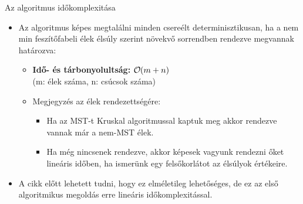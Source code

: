 \documentclass[aspectratio=169]{beamer}
\DeclareRobustCommand{\bigO}{
  \text{\usefont{OMS}{cmsy}{m}{n}O}
}
\begin{document}
\begin{frame}{Az algoritmus időkomplexitása}
\small
\begin{itemize}
  \item Az algoritmus képes megtalálni minden csereélt determinisztikusan, ha a nem min feszítőfabeli élek élsúly szerint növekvő sorrendben rendezve megvannak határozva:
  \begin{itemize}
    \item \textbf{Idő- és tárbonyolultság: $ \bigO ( m + n)$} \\
    \vspace{0.5em}
    (m: élek száma, n: csúcsok száma)
    \vspace{0.5em}
    \item Megjegyzés az élek rendezettségére:
    \begin{itemize}
      \item Ha az MST-t Kruskal algoritmussal kaptuk meg akkor rendezve vannak már a nem-MST élek.
      \item Ha még nincsenek rendezve, akkor képesek vagyunk rendezni őket lineáris időben, ha ismerünk egy felsőkorlátot az élsúlyok értékeire. %
    \end{itemize}
  \end{itemize}
  \item A cikk előtt lehetett tudni, hogy ez elméletileg lehetőséges, de ez az első algoritmikus megoldás erre lineáris időkomplexitással.
\end{itemize}
\end{frame}

\end{document}
